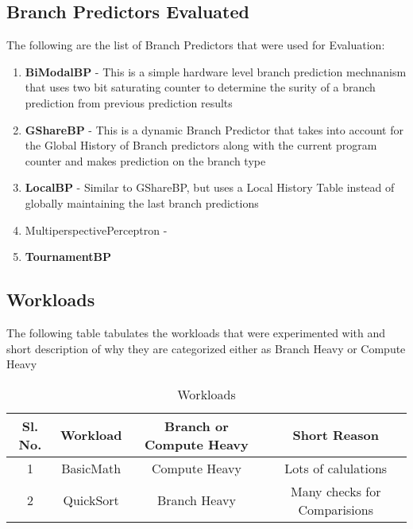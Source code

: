 \documentclass[11pt, a4paper]{article}
\begin{document}
\subsection{Branch Predictors Evaluated}
The following are the list of Branch Predictors that were used for Evaluation:

\begin{enumerate}
    \item \textbf{BiModalBP} - This is a simple hardware level branch prediction mechnanism that uses two bit saturating counter to determine the surity of a branch prediction from previous prediction results
    \item \textbf{GShareBP} - This is a dynamic Branch Predictor that takes into account for the Global History of Branch predictors along with the current program counter and makes prediction on the branch type
    \item \textbf{LocalBP} - Similar to GShareBP, but uses a Local History Table instead of globally maintaining the last branch predictions
    \item MultiperspectivePerceptron - 
    \item \textbf{TournamentBP}
\end{enumerate}

\subsection{Workloads}
The following table tabulates the workloads that were experimented with and short description of why they are categorized either as Branch Heavy or Compute Heavy

\begin{table}[h!]
    \centering
    \caption{Workloads}
    \begin{tabular}{|c|c|c|c|}
        \hline
        \textbf{Sl. No.} & \textbf{Workload} & \textbf{Branch or Compute Heavy} & \textbf{Short Reason} \\
        \hline
        1 & BasicMath & Compute Heavy & Lots of calulations \\
        \hline
        2 & QuickSort & Branch Heavy & Many checks for Comparisions \\
        \hline
    \end{tabular}
\end{table}
\end{document}
